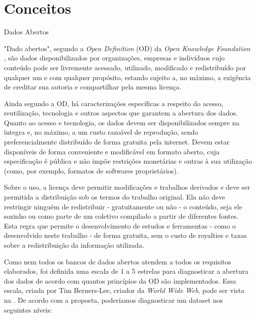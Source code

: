 \chapter{Conceitos}\label{chp:CAP_CONCEITOS}

{\large Dados Abertos}

"Dado abertos", segundo a \textit{Open Definition} (OD) da \textit{Open Knowledge Foundation} \cite{REF_OPEN_DEFINITION}, são dados disponibilizados por organizações, empresas e indivíduos cujo conteúdo pode ser livremente acessado, utilizado, modificado e redistribuído por qualquer um e com qualquer propósito, estando sujeito a, no máximo, a exigência de creditar sua autoria e compartilhar pela mesma licença.

Ainda segundo a OD, há caracterizações específicas a respeito do acesso, reutilização, tecnologia e outros aspectos que garantem a abertura dos dados. Quanto ao acesso e tecnologia, os dados devem ser disponibilizados sempre na íntegra e, no máximo, a um custo razoável de reprodução, sendo preferencialmente distribuído de forma gratuita pela internet. Devem estar disponíveis de forma conveniente e modificável em formato aberto, cuja especificação é pública e não impõe restrições monetárias e outras à sua utilização (como, por exemplo, formatos de softwares proprietários).

Sobre o uso, a licença deve permitir modificações e trabalhos derivados e deve ser permitida a distribuição sob os termos do trabalho original. Ela não deve restringir ninguém de redistribuir - gratuitamente ou não - o conteúdo, seja ele sozinho ou como parte de um coletivo compilado a partir de diferentes fontes. Esta regra que permite o desenvolvimento de estudos e ferramentas - como o desenvolvido neste trabalho - de forma gratuita, sem o custo de royalties e taxas sobre a redistribuição da informação utilizada.

Como nem todos os bancos de dados abertos atendem a todos os requisitos elaborados, foi definida uma escala de 1 a 5 estrelas para diagnosticar a abertura dos dados de acordo com quantos princípios da OD são implementados\cite{REF_ART_5_STARS}. Essa escala, criada por Tim Berners-Lee, criador da \textit{World Wide Web}, pode ser vista na . De acordo com a proposta, poderíamos diagnosticar um dataset nos seguintes níveis:

